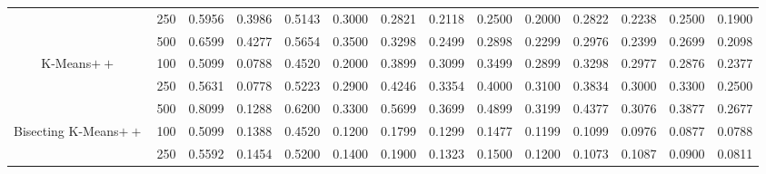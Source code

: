 \documentclass[preprint,12pt]{elsarticle}
\begin{document}
\begin{table}[!t]
{\begin{tabular}{cc|cc|cc|cc|cc|cc|cc}
                          & 250      & 0.5956          & \multicolumn{1}{l|}{0.3986}          & 0.5143          & \multicolumn{1}{l|}{0.3000}          & 0.2821          & \multicolumn{1}{l|}{0.2118}          & 0.2500          & \multicolumn{1}{l|}{0.2000}          & 0.2822          & \multicolumn{1}{l|}{0.2238}          & 0.2500          & 0.1900          \\
                          & 500      & 0.6599          & \multicolumn{1}{l|}{0.4277}          & 0.5654          & \multicolumn{1}{l|}{0.3500}          & 0.3298          & \multicolumn{1}{l|}{0.2499}          & 0.2898          & \multicolumn{1}{l|}{0.2299}          & 0.2976          & \multicolumn{1}{l|}{0.2399}          & 0.2699          & 0.2098          \\ \hline
K-Means$++$               & 100      & 0.5099          & \multicolumn{1}{l|}{0.0788}          & 0.4520          & \multicolumn{1}{l|}{0.2000}          & 0.3899          & \multicolumn{1}{l|}{0.3099}          & 0.3499          & \multicolumn{1}{l|}{0.2899}          & 0.3298          & \multicolumn{1}{l|}{0.2977}          & 0.2876          & 0.2377          \\
                          & 250      & 0.5631          & \multicolumn{1}{l|}{0.0778}          & 0.5223          & \multicolumn{1}{l|}{0.2900}          & 0.4246          & \multicolumn{1}{l|}{0.3354}          & 0.4000          & \multicolumn{1}{l|}{0.3100}          & 0.3834          & \multicolumn{1}{l|}{0.3000}          & 0.3300          & 0.2500          \\
                          & 500      & 0.8099          & \multicolumn{1}{l|}{0.1288}          & 0.6200          & \multicolumn{1}{l|}{0.3300}          & 0.5699          & \multicolumn{1}{l|}{0.3699}          & 0.4899          & \multicolumn{1}{l|}{0.3199}          & 0.4377          & \multicolumn{1}{l|}{0.3076}          & 0.3877          & 0.2677          \\ \hline
Bisecting K-Means$++$     & 100      & 0.5099          & \multicolumn{1}{l|}{0.1388}          & 0.4520          & \multicolumn{1}{l|}{0.1200}          & 0.1799          & \multicolumn{1}{l|}{0.1299}          & 0.1477          & \multicolumn{1}{l|}{0.1199}          & 0.1099          & \multicolumn{1}{l|}{0.0976}          & 0.0877          & 0.0788          \\
                          & 250      & 0.5592          & \multicolumn{1}{l|}{0.1454}          & 0.5200          & \multicolumn{1}{l|}{0.1400}          & 0.1900          & \multicolumn{1}{l|}{0.1323}          & 0.1500          & \multicolumn{1}{l|}{0.1200}          & 0.1073          & \multicolumn{1}{l|}{0.1087}          & 0.0900          & 0.0811          \\

\end{tabular}}
\end{table}
\end{document}
